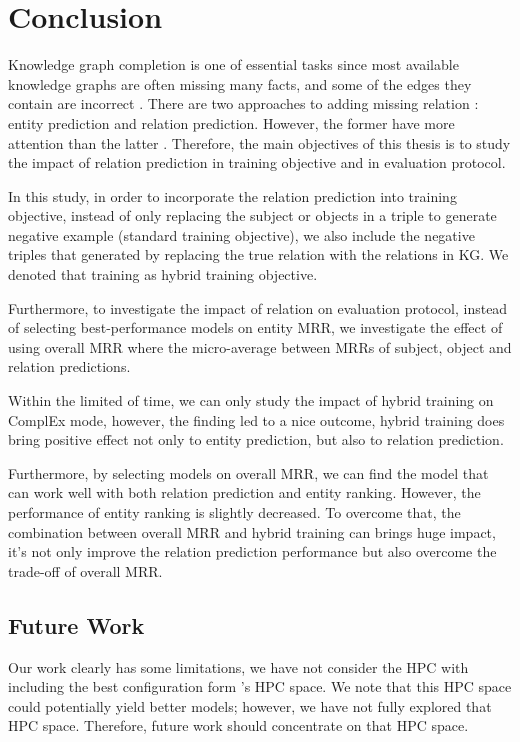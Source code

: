 \chapter{Conclusion}
\label{cha:conclusion}


Knowledge graph completion is one of essential tasks since most available knowledge graphs are often missing many facts, and some of the edges they contain are incorrect \citep{angeli2013philosophers}. There are two approaches to adding missing relation \citep{wang2017knowledge}: entity prediction and relation prediction. However, the former have more attention than the latter \citep{chang2020benchmark}.
Therefore, the main objectives of this thesis is to study the impact of relation prediction in training objective and in evaluation protocol.  

In this study, in order to incorporate the relation prediction into training objective, instead of only replacing the subject or objects in a triple to generate negative example (standard training objective), we also include the negative triples that generated by replacing the true relation with the relations in KG. We denoted that training as hybrid training objective. 

Furthermore, to investigate the impact of relation on evaluation protocol, instead of selecting best-performance models on entity MRR, we investigate the effect of using overall MRR where the micro-average between MRRs of subject, object and relation predictions. 

Within the limited of time, we can only study the impact of hybrid training on ComplEx mode, however, the finding led to a nice outcome, hybrid training does bring positive effect not only to entity prediction, but also to relation prediction. 

Furthermore, by selecting models on overall MRR, we can find the model that can work well with both relation prediction and entity ranking. However, the performance of entity ranking is slightly decreased. To overcome that, the combination between overall MRR and hybrid training can brings huge impact, it's not only improve the relation prediction performance but also overcome the trade-off of overall MRR. 


\section{Future Work}
\label{sec:future}

Our work clearly has some limitations, we have not consider the HPC with including the best configuration form \cite{chen2021relation}'s HPC space.
We note that this HPC space could potentially yield better models; however, we have not fully explored that HPC space. Therefore, future work should concentrate on that HPC space. 

